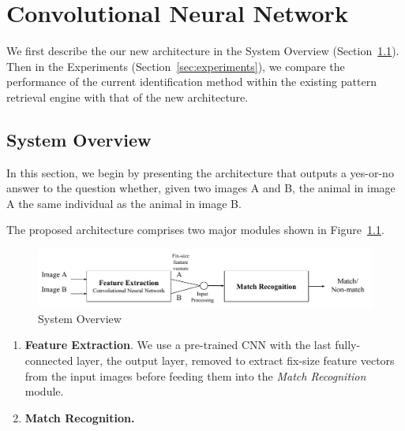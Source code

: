 \graphicspath{{./images/chap7/}}
\chapter{Convolutional Neural Network} %
\label{cha:convolutional_neural_network}

We first describe the our new architecture in the System Overview
(Section~\ref{sec:system_overview}). Then in the Experiments (Section~\ref{sec:experiments}), we
compare the performance of the current identification method within the
existing pattern retrieval engine with that of the new architecture.

\section{System Overview} %
\label{sec:system_overview}

In this section, we begin by presenting the architecture that outputs a
yes-or-no answer to the question whether, given two images A and B, the animal
in image A the same individual as the animal in image B.

The proposed architecture comprises two major modules shown in
Figure~\ref{fig:cnn_overview}.

\begin{figure}[htb]
  \centering
  \includegraphics[width=\textwidth]{system/overview}
  \caption{System Overview}
  \label{fig:cnn_overview} %
\end{figure}

\begin{enumerate}
  \item \textbf{Feature Extraction}. We use a pre-trained CNN with the last
  fully-connected layer, the output layer, removed to extract fix-size feature
  vectors from the input images before feeding them into the \emph{Match Recognition} module.
  \item \textbf{Match Recognition.}
\end{enumerate}

